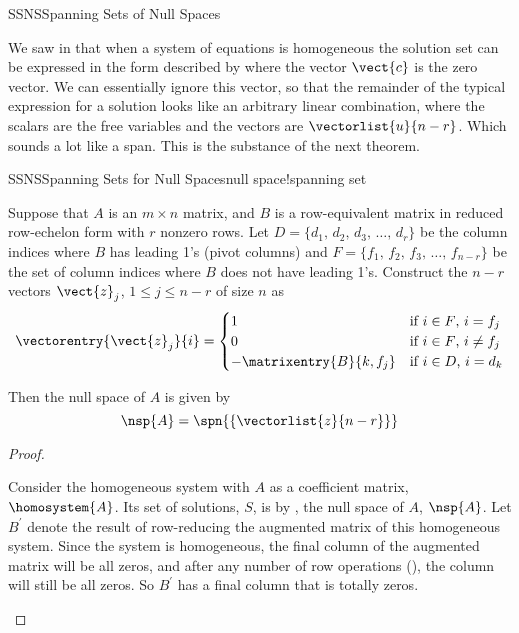 \begin{subsect}{SSNS}{Spanning Sets of Null Spaces}
%
\begin{para}We saw in  that when a system of equations is homogeneous the solution set can be expressed in the form described by  where the vector $\vect{c}$ is the zero vector.  We can essentially ignore this vector, so that the remainder of the typical expression for a solution looks like an arbitrary linear combination, where the scalars are the free variables and the vectors are $\vectorlist{u}{n-r}$.  Which sounds a lot like a span.  This is the substance of the next theorem.\end{para}
%
\begin{theorem}{SSNS}{Spanning Sets for Null Spaces}{null space!spanning set}
\begin{para}Suppose that $A$ is an $m\times n$ matrix, and $B$ is a row-equivalent matrix in reduced row-echelon form with $r$ nonzero rows.  Let $D=\{d_1,\,d_2,\,d_3,\,\ldots,\,d_r\}$ be the column indices where $B$ has leading 1's (pivot columns) and $F=\{f_1,\,f_2,\,f_3,\,\ldots,\,f_{n-r}\}$ be the set of column indices where $B$ does not have leading 1's.  Construct the $n-r$ vectors $\vect{z}_j$, $1\leq j\leq n-r$ of size $n$ as
%
\begin{equation*}
\vectorentry{\vect{z}_j}{i}=
\begin{cases}
1&\text{if $i\in F$, $i=f_j$}\\
0&\text{if $i\in F$, $i\neq f_j$}\\
-\matrixentry{B}{k,f_j}&\text{if $i\in D$, $i=d_k$}
\end{cases}
\end{equation*}
\end{para}
%
\begin{para}Then the null space of $A$ is given by
%
\begin{equation*}
\nsp{A}=\spn{\left\{\vectorlist{z}{n-r}\right\}}
\end{equation*}
\end{para}
%
\end{theorem}
%
\begin{proof}
\begin{para}Consider the homogeneous system with $A$ as a coefficient matrix, $\homosystem{A}$.  Its set of solutions, $S$, is by , the null space of $A$, $\nsp{A}$.  Let $B^{\prime}$ denote the result of row-reducing the augmented matrix of this homogeneous system.  Since the system is homogeneous, the final column of the augmented matrix will be all zeros, and after any number of row operations (), the column will still be all zeros.  So $B^{\prime}$ has a final column that is totally zeros.\end{para}

\end{proof}
\end{subsect}
